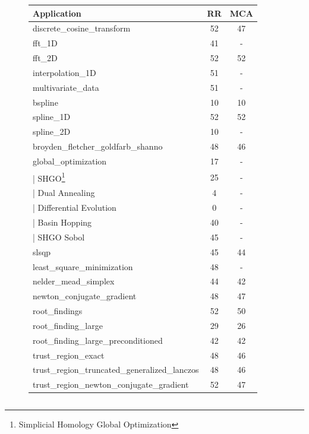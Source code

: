 \documentclass[11pt]{article}
\begin{document}
\begin{table}
\small
\begin{subfigure}[t]{.5\linewidth}
    \centering
    \begin{tabular}{|l|c|c|}
    \hline 
    Application & RR & MCA \\
    \hline
    discrete\_cosine\_transform & 52 & 47 \\ 
    fft\_1D & 41 & - \\
    fft\_2D & 52 & 52  \\
    \hline
    interpolation\_1D & 51 & -   \\
    multivariate\_data & 51 & - \\
    bspline  & 10 & 10  \\
    spline\_1D & 52 & 52 \\
    spline\_2D & 10 & - \\
    \hline
    broyden\_fletcher\_goldfarb\_shanno & 48 & 46 \\
    global\_optimization & 17 & - \\
    | SHGO\footnote{Simplicial Homology Global Optimization} & 25 & - \\
    | Dual Annealing & 4 & - \\
    | Differential Evolution & 0 & - \\
    | Basin Hopping & 40 & - \\
    | SHGO Sobol & 45 & - \\
    slsqp & 45 & 44 \\
    least\_square\_minimization & 48 & -  \\
    nelder\_mead\_simplex  & 44 & 42  \\
    newton\_conjugate\_gradient  & 48 & 47 \\
    root\_findings  & 52 & 50 \\
    root\_finding\_large & 29 & 26   \\
    root\_finding\_large\_preconditioned & 42 & 42 \\
    trust\_region\_exact& 48 & 46  \\
    trust\_region\_truncated\_generalized\_lanczos & 48 & 46  \\
    trust\_region\_newton\_conjugate\_gradient & 52 & 47 \\
    \hline
    \end{tabular}
\end{subfigure}
\hspace{1cm}
\begin{subfigure}[t]{.5\linewidth}
    \begin{tabular}{|l|c|c|}

\end{tabular}
\end{subfigure}
\end{table}
\end{document}
